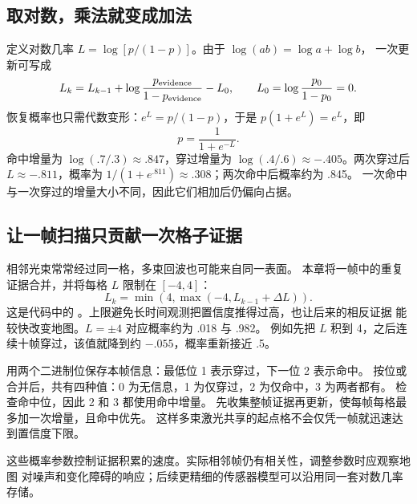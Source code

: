 \subsection{取对数，乘法就变成加法}
定义对数几率 $L=\log[p/(1-p)]$。由于 $\log(ab)=\log a+\log b$，
一次更新可写成
\begin{equation}
L_k=L_{k-1}+\log\frac{p_{\rm evidence}}{1-p_{\rm evidence}}-L_0,
\qquad L_0=\log\frac{p_0}{1-p_0}=0.
\end{equation}
恢复概率也只需代数变形：$e^L=p/(1-p)$，于是 $p(1+e^L)=e^L$，即
\begin{equation}
p=\frac{1}{1+e^{-L}}.
\end{equation}
命中增量为 $\log(.7/.3)\approx.847$，穿过增量为
$\log(.4/.6)\approx-.405$。两次穿过后 $L\approx-.811$，概率为
$1/(1+e^{.811})\approx.308$；两次命中后概率约为 .845。
一次命中与一次穿过的增量大小不同，因此它们相加后仍偏向占据。

\subsection{让一帧扫描只贡献一次格子证据}
相邻光束常常经过同一格，多束回波也可能来自同一表面。
本章将一帧中的重复证据合并，并将每格 $L$ 限制在 $[-4,4]$：
\begin{equation}
L_k=\min\!\left(4,\max\!\left(-4,L_{k-1}+\Delta L\right)\right).
\end{equation}
这是代码中的 。上限避免长时间观测把置信度推得过高，也让后来的相反证据
能较快改变地图。$L=\pm4$ 对应概率约为 .018 与 .982。
例如先把 $L$ 积到 4，之后连续十帧穿过，该值就降到约 $-.055$，概率重新接近 .5。

\par\noindent\begin{minipage}{\linewidth}

\end{minipage}\par

 用两个二进制位保存本帧信息：最低位 1 表示穿过，下一位 2 表示命中。
按位或 \code{|=} 合并后，共有四种值：0 为无信息，1 为仅穿过，2 为仅命中，3 为两者都有。
 检查命中位，因此 2 和 3 都使用命中增量。
先收集整帧证据再更新，使每帧每格最多加一次增量，且命中优先。
这样多束激光共享的起点格不会仅凭一帧就迅速达到置信度下限。

这些概率参数控制证据积累的速度。实际相邻帧仍有相关性，调整参数时应观察地图
对噪声和变化障碍的响应；后续更精细的传感器模型可以沿用同一套对数几率存储。

